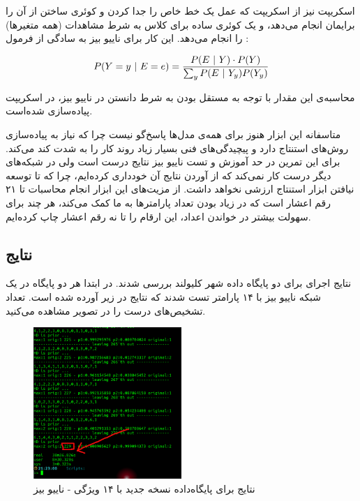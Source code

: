 \documentclass[11.5pt,a4paper]{article}
\begin{document}
اسکریپت  نیز از اسکریپت  که عمل یک خط خاص را جدا کردن و کوئری ساختن از آن را برایمان انجام می‌دهد، و  یک کوئری ساده‌ برای کلاس به شرط مشاهدات (همه متغیرها) را انجام می‌دهد. این کار برای ناییو بیز به سادگی از فرمول :

\begin{equation}
P(Y=y \ | \ E = e ) = { {P(E \ | \ Y) \cdot P(Y) } \over {\sum_{y} P(E \ | \ Y_y)P(Y_y)} }
\end{equation}

محاسبه‌ی این مقدار با توجه به مستقل بودن به شرط دانستن  در ناییو بیز، در اسکریپت  پیاده‌سازی شده‌است. 

متاسفانه این ابزار هنوز برای همه‌ی مدل‌ها پاسخ‌گو نیست چرا که نیاز به پیاده‌سازی روش‌های استنتاج دارد و پیچیدگی‌های فنی بسیار زیاد  روند کار را به شدت کند می‌کند. برای این تمرین در حد آموزش و تست ناییو بیز نتایج درست است ولی در شبکه‌های دیگر درست کار نمی‌کند که از آوردن نتایج آن خودداری کرده‌ایم، چرا که تا توسعه نیافتن ابزار استنتاج ارزشی نخواهد داشت. از مزیت‌های این ابزار انجام محاسبات تا ۲۱ رقم اعشار است که در زیاد بودن تعداد پارامترها به ما کمک می‌کند، هر چند برای سهولت بیشتر در خواندن اعداد، این ارقام را تا نه رقم اعشار چاپ کرده‌ایم. 

\subsection{نتایج}

نتایج اجرای  برای دو پایگاه داده شهر کلیولند بررسی شدند. در ابتدا هر دو پایگاه در یک شبکه ناییو بیز با ۱۴ پارامتر تست شدند که نتایج در زیر آورده شده است. تعداد تشخیص‌های درست را در تصویر مشاهده می‌کنید. 

\begin{figure}[h]
\centering
\includegraphics[width=0.5\textwidth]{1}
\caption{نتایج برای پایگاه‌داده نسخه جدید با ۱۴ ویژگی - ناییو بیز}
\label{fig2}
\end{figure}
\end{document}
